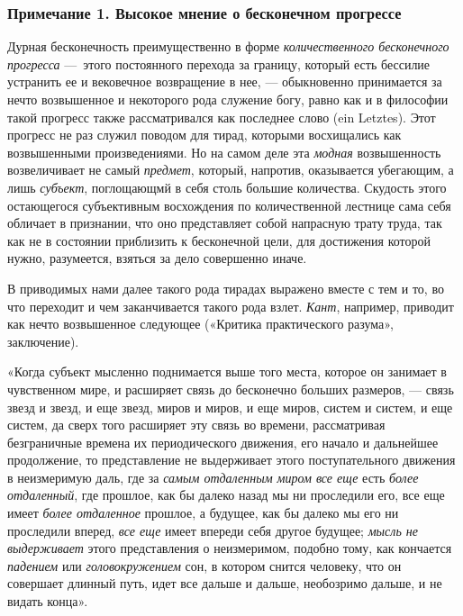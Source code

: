 \subsubsection[Примечание 1. Высокое мнение о бесконечном прогрессе]
{Примечание 1. Высокое мнение о бесконечном прогрессе}

Дурная бесконечность преимущественно в форме
{\em количественного бесконечного прогресса} —~этого
постоянного перехода за границу, который есть бессилие устранить ее и
вековечное возвращение в нее, — обыкновенно принимается за нечто
возвышенное и некоторого рода служение богу, равно как и в философии такой
прогресс также рассматривался как последнее слово (ein Letztes). Этот
прогресс не раз служил поводом для тирад, которыми восхищались как
возвышенными произведениями. Но на самом деле эта
{\em модная} возвышенность возвеличивает не самый
{\em предмет}, который, напротив, оказывается
убегающим, а лишь {\em субъект}, поглощающмй в себя
столь большие количества. Скудость этого остающегося субъективным
восхождения по количественной лестнице сама себя обличает в признании, что
оно представляет собой напрасную трату труда, так как не в состоянии
приблизить к бесконечной цели, для достижения которой нужно, разумеется,
взяться за дело совершенно иначе.

В приводимых нами далее такого рода тирадах выражено вместе с тем и то, во
что переходит и чем заканчивается такого рода взлет.
{\em Кант}, например, приводит как нечто возвышенное
следующее («Критика практического разума», заключение).

«Когда субъект мысленно поднимается выше того места, которое он занимает в
чувственном мире, и расширяет связь до бесконечно больших размеров, — связь
звезд и звезд, и еще звезд, миров и миров, и еще миров, систем и систем, и
еще систем, да сверх того расширяет эту связь во времени, рассматривая
безграничные времена их периодического движения, его начало и дальнейшее
продолжение, то представление не выдерживает этого поступательного движения
в неизмеримую даль, где за {\em самым отдаленным миром
все еще} есть {\em более отдаленный}, где прошлое, как
бы далеко назад мы ни проследили его, все еще имеет
{\em более отдаленное} прошлое, а будущее, как бы
далеко мы его ни проследили вперед, {\em все еще} имеет
впереди себя другое будущее; {\em мысль не выдерживает}
этого представления о неизмеримом, подобно тому, как кончается
{\em падением} или
{\em головокружением} сон, в котором снится человеку,
что он совершает длинный путь, идет все дальше и дальше, необозримо дальше,
и не видать конца».

